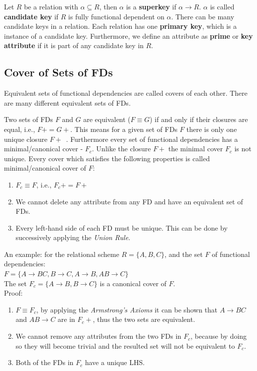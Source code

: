 Let $R$ be a relation with $\alpha \subseteq R$, then $\alpha$ is a \textbf{superkey} if $\alpha \rightarrow R$. 
$\alpha$ is called \textbf{candidate key} if $R$ is fully functional dependent on $\alpha$. 
There can be many candidate keys in a relation. Each relation has one \textbf{primary key},
which is a instance of a candidate key. Furthermore, we define an attribute as \textbf{prime} or
\textbf{key attribute} if 
it is part of any candidate key in $R$. 



\subsection{Cover of Sets of FDs}
Equivalent sets of functional dependencies are called covers of each other.
There are many different equivalent sets of FDs. 

Two sets of FDs $F$ and $G$ are equivalent ($F \equiv G$)
if and only if their closures are equal, i.e., $F+ = G+$. This means for a given set of FDs $F$ there is 
only one unique closure $F+$~\cite{bdb2}. Furthermore every set of functional dependencies 
has a minimal/canonical cover - $F_c$. Unlike the closure $F+$ the minimal cover $F_c$ is not unique. 
Every cover which satisfies the following properties is called minimal/canonical cover of $F$:

\begin{enumerate}
  \item $F_c \equiv F$, i.e., $F_{c}+ = F+$
  \item We cannot delete any attribute from any FD and have an equivalent set of FDs.
  \item Every left-hand side of each FD must be unique. This can be done by successively applying the \textit{Union Rule}.
\end{enumerate}

An example: for the relational scheme $R = \{A, B, C\}$, and the set $F$ of functional dependencies: \\

$ F = \{A \rightarrow BC, B \rightarrow C, A \rightarrow B, AB \rightarrow C\}$ \\
\indent The set $F_c = \{A \rightarrow B, B \rightarrow C\}$ is a canonical cover of $F$. \\
\indent Proof:
\indent \begin{enumerate}
  \item $F \equiv F_c $, by applying the \textit{Armstrong's Axioms} it can be shown that $A \rightarrow BC$ and $AB \rightarrow C$ are in $F_{c} + $, thus the two sets are equivalent.
  \item We cannot remove any attributes from the two FDs in $F_c$, because by doing so they will become trivial and the resulted set will not be equivalent to $F_c$.
  \item Both of the FDs in $F_c$ have a unique LHS. 
\end{enumerate}


